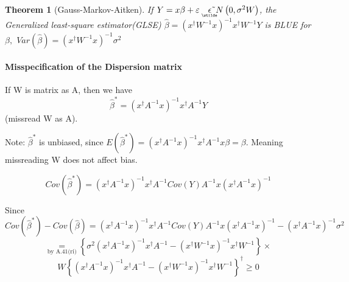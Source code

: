 \documentclass{article}
\newtheorem{theorem}{Theorem}
\begin{document}
\begin{theorem}[Gauss-Markov-Aitken]
If $Y=x\beta +\varepsilon \quad 
\underaccent{\wtilde}{\epsilon}%
\symbol{126}N\left( 0,\sigma ^{2}W\right) $, the Generalized least-square
estimator(GLSE) $\hat{\beta}=\left( x^{\dagger }W^{-1}x\right)
^{-1}x^{\dagger }W^{-1}Y$ is BLUE for $\beta ,$ $Var\left( \hat{\beta}%
\right) =\left( x^{\dagger }W^{-1}x\right) ^{-1}\sigma ^{2}$
\end{theorem}

\paragraph{Misspecification of the Dispersion matrix}

\bigskip

If W is matrix as A, then we have%
\begin{equation*}
\hat{\beta}^{\ast }=\left( x^{\dagger }A^{-1}x\right) ^{-1}x^{\dagger
}A^{-1}Y
\end{equation*}%
(missread W as A).

\bigskip

Note: $\hat{\beta}^{\ast }$ is unbiased, since $E\left( \hat{\beta}^{\ast
}\right) =\left( x^{\dagger }A^{-1}x\right) ^{-1}x^{\dagger }A^{-1}x\beta
=\beta $. Meaning missreading W does not affect bias.

\begin{equation*}
Cov\left( \hat{\beta}^{\ast }\right) =\left( x^{\dagger }A^{-1}x\right)
^{-1}x^{\dagger }A^{-1}Cov\left( Y\right) A^{-1}x\left( x^{\dagger
}A^{-1}x\right) ^{-1}
\end{equation*}%
\qquad

\bigskip

Since $Cov\left( \hat{\beta}^{\ast }\right) -Cov\left( \hat{\beta}\right)
=\left( x^{\dagger }A^{-1}x\right) ^{-1}x^{\dagger }A^{-1}Cov\left( Y\right)
A^{-1}x\left( x^{\dagger }A^{-1}x\right) ^{-1}-\left( x^{\dagger
}A^{-1}x\right) ^{-1}\sigma ^{2}$%
\begin{equation*}
\underset{\text{by A.41(ri)}}{=}\left\{ \sigma ^{2}\left( x^{\dagger
}A^{-1}x\right) ^{-1}x^{\dagger }A^{-1}-\left( x^{\dagger }W^{-1}x\right)
^{-1}x^{\dagger }W^{-1}\right\} \times
\end{equation*}%
\begin{equation*}
W\left\{ \left( x^{\dagger }A^{-1}x\right) ^{-1}x^{\dagger }A^{-1}-\left(
x^{\dagger }W^{-1}x\right) ^{-1}x^{\dagger }W^{-1}\right\} ^{\dagger }\geq 0
\end{equation*}
\end{document}
